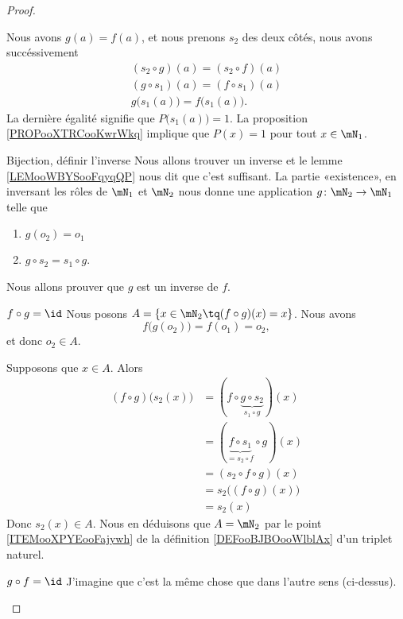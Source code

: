 \begin{proof}
\begin{subproof}
        Nous avons \( g(a)=f(a)\), et nous prenons \( s_2\) des deux côtés, nous avons succéssivement 
        \begin{subequations}
            \begin{align}
            (s_2\circ g)(a)=(s_2\circ f)(a)\\
(g\circ s_1)(a)=(f\circ s_1)(a)\\
g\big( s_1(a) \big)=f\big( s_1(a) \big).
            \end{align}
        \end{subequations}
        La dernière égalité signifie que \( P\big( s_1(a) \big)=1\). La proposition \ref{PROPooXTRCooKwrWkq} implique que \( P(x)=1\) pour tout \( x\in \mN_1\).
    \item[Bijection, définir l'inverse]
        Nous allons trouver un inverse et le lemme \ref{LEMooWBYSooFqyqQP} nous dit que c'est suffisant. La partie «existence», en inversant les rôles de \( \mN_1\) et \( \mN_2\) nous donne une application \( g\colon \mN_2\to \mN_1\) telle que
        \begin{enumerate}
            \item
                \( g(o_2)=o_1\)
            \item
                \( g\circ s_2=s_1\circ g\).
        \end{enumerate}
        Nous allons prouver que \( g\) est un inverse de \( f\).
    \item[\( f\circ g=\id\)]
        Nous posons \( A=\{ x\in \mN_2\tq (f\circ g)(x)=x \}\). Nous avons
        \begin{equation}
            f\big( g(o_2) \big)=f(o_1)=o_2,
        \end{equation}
        et donc \( o_2\in A\).

        Supposons que \( x\in A\). Alors
        \begin{subequations}
            \begin{align}
                (f\circ g)\big( s_2(x) \big)&=(f\circ \underbrace{g\circ s_2}_{s_1\circ g})(x)\\
                &=(\underbrace{f\circ s_1}_{=s_2\circ f}\circ g)(x)\\
                &=(s_2\circ f\circ g)(x)\\
                &=s_2\big( (f\circ g)(x) \big)\\
                &=s_2(x)
            \end{align}
        \end{subequations}
        Donc \( s_2(x)\in A\). Nous en déduisons que \( A=\mN_2\) par le point \ref{ITEMooXPYEooFajywh} de la définition \ref{DEFooBJBOooWlblAx} d'un triplet naturel.
    \item[\( g\circ f=\id\)]
        J'imagine que c'est la même chose que dans l'autre sens (ci-dessus).
    \end{subproof}
\end{proof}

